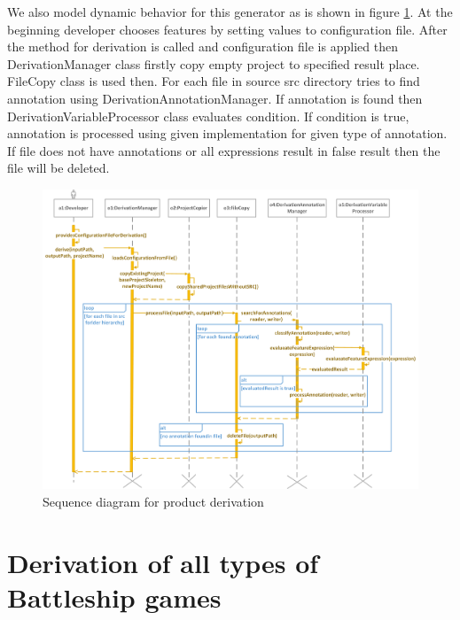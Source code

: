 \documentclass[11pt,english,a4paper,twoside]{article}
\begin{document}
We also model dynamic behavior for this generator as is shown in figure \ref{derivationProductSequenceDiagram}. At the beginning developer chooses features by setting values to configuration file. After the method for derivation is called and configuration file is applied then DerivationManager class firstly copy empty project to specified result place. FileCopy class is used then. For each file in source src directory tries to find annotation using DerivationAnnotationManager. If annotation is found then DerivationVariableProcessor class evaluates condition. If condition is true, annotation is processed using given implementation for given type of annotation. If file does not have annotations or all expressions result in false result then the file will be deleted.

\begin{figure}[!t]  %
					\begin{center}
									\includegraphics[width=\linewidth]{fig/derivationProcessTight.png}
									\caption{Sequence diagram for product derivation}
									\label{derivationProductSequenceDiagram}
					\end{center}
\end{figure}


\section{Derivation of all types of Battleship games} \label{allDerivations}
\end{document}
